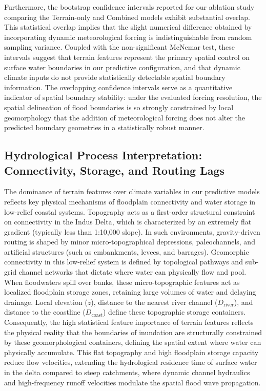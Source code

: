 \documentclass[12pt, a4paper]{article}
\begin{document}
Furthermore, the bootstrap confidence intervals reported for our ablation study comparing the Terrain-only and Combined models exhibit substantial overlap. This statistical overlap implies that the slight numerical difference obtained by incorporating dynamic meteorological forcing is indistinguishable from random sampling variance. Coupled with the non-significant McNemar test, these intervals suggest that terrain features represent the primary spatial control on surface water boundaries in our predictive configuration, and that dynamic climate inputs do not provide statistically detectable spatial boundary information. The overlapping confidence intervals serve as a quantitative indicator of spatial boundary stability: under the evaluated forcing resolution, the spatial delineation of flood boundaries is so strongly constrained by local geomorphology that the addition of meteorological forcing does not alter the predicted boundary geometries in a statistically robust manner.

\subsection{Hydrological Process Interpretation: Connectivity, Storage, and Routing Lags}
The dominance of terrain features over climate variables in our predictive models reflects key physical mechanisms of floodplain connectivity and water storage in low-relief coastal systems. Topography acts as a first-order structural constraint on connectivity in the Indus Delta, which is characterized by an extremely flat gradient (typically less than 1:10,000 slope). In such environments, gravity-driven routing is shaped by minor micro-topographical depressions, paleochannels, and artificial structures (such as embankments, levees, and barrages). Geomorphic connectivity in this low-relief system is defined by topological pathways and sub-grid channel networks that dictate where water can physically flow and pool. When floodwaters spill over banks, these micro-topographic features act as localized floodplain storage zones, retaining large volumes of water and delaying drainage. Local elevation ($z$), distance to the nearest river channel ($D_{\text{river}}$), and distance to the coastline ($D_{\text{coast}}$) define these topographic storage containers. Consequently, the high statistical feature importance of terrain features reflects the physical reality that the boundaries of inundation are structurally constrained by these geomorphological containers, defining the spatial extent where water can physically accumulate. This flat topography and high floodplain storage capacity reduce flow velocities, extending the hydrological residence time of surface water in the delta compared to steep catchments, where dynamic channel hydraulics and high-frequency runoff velocities modulate the spatial flood wave propagation.
\end{document}
